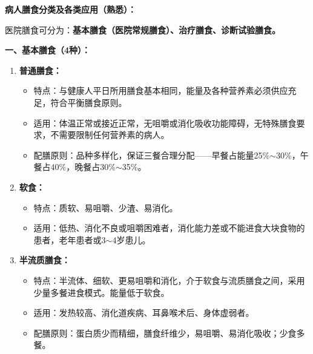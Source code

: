 \begin{tipbox}
\textbf{病人膳食分类及各类应用（熟悉）：}

医院膳食可分为：\textbf{基本膳食（医院常规膳食）、治疗膳食、诊断试验膳食。}

\textbf{一、基本膳食（4种）：}

\begin{enumerate}[leftmargin=*]
    \item \textbf{普通膳食：}
    \begin{itemize}[leftmargin=*]
        \item 特点：与健康人平日所用膳食基本相同，能量及各种营养素必须供应充足，符合平衡膳食原则。
        \item 适用：体温正常或接近正常，无咀嚼或消化吸收功能障碍，无特殊膳食要求，不需要限制任何营养素的病人。
        \item 配膳原则：品种多样化，保证三餐合理分配——早餐占能量25\%$\sim$30\%，午餐占40\%，晚餐占30\%$\sim$35\%。
    \end{itemize}

    \item \textbf{软食：}
    \begin{itemize}[leftmargin=*]
        \item 特点：质软、易咀嚼、少渣、易消化。
        \item 适用：低热、消化不良或咀嚼困难者，消化能力差或不能进食大块食物的患者，老年患者或3$\sim$4岁患儿。
    \end{itemize}

    \item \textbf{半流质膳食：}
    \begin{itemize}[leftmargin=*]
        \item 特点：半流体、细软、更易咀嚼和消化，介于软食与流质膳食之间，采用少量多餐进食模式。能量低于软食。
        \item 适用：发热较高、消化道疾病、耳鼻喉术后、身体虚弱者。
        \item 配膳原则：蛋白质少而精细，膳食纤维少，易咀嚼、易消化吸收；少食多餐。
    \end{itemize}


\end{enumerate}
\end{tipbox}
